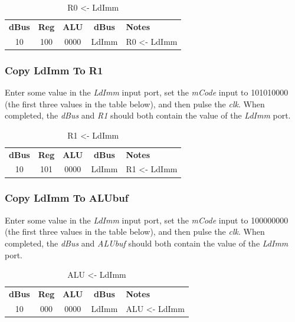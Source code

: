 \begin{table}[H]
	\sffamily
	\newcommand{\head}[1]{\textcolor{white}{\textbf{#1}}}		
	\begin{center}
		\begin{tabular}{ccccl} 
			\textbf{dBus} & \textbf{Reg} & \textbf{ALU} & \textbf{dBus} & \textbf{Notes} \\
			10 & 100 & 0000 & LdImm & R0 <- LdImm \\
		\end{tabular}
	\end{center}
	\caption{R0 <- LdImm}
	\label{tab:11-01}
\end{table}

\subsubsection{Copy LdImm To R1}
Enter some value in the \textit{LdImm} input port, set the \textit{mCode} input to 101010000 (the first three values in the table below), and then pulse the \textit{clk}. When completed, the \textit{dBus} and \textit{R1} should both contain the value of the \textit{LdImm} port.

\begin{table}[H]
	\sffamily
	\newcommand{\head}[1]{\textcolor{white}{\textbf{#1}}}		
	\begin{center}
		\begin{tabular}{ccccl} 
			\textbf{dBus} & \textbf{Reg} & \textbf{ALU} & \textbf{dBus} & \textbf{Notes} \\
			10 & 101 & 0000 & LdImm & R1 <- LdImm
		\end{tabular}
	\end{center}
	\caption{R1 <- LdImm}
	\label{tab:11-02}
\end{table}

\subsubsection{Copy LdImm To ALUbuf}
Enter some value in the \textit{LdImm} input port, set the \textit{mCode} input to 100000000 (the first three values in the table below), and then pulse the \textit{clk}. When completed, the \textit{dBus} and \textit{ALUbuf} should both contain the value of the \textit{LdImm} port.

\begin{table}[H]
	\sffamily
	\newcommand{\head}[1]{\textcolor{white}{\textbf{#1}}}		
	\begin{center}
		\begin{tabular}{ccccl} 
			\textbf{dBus} & \textbf{Reg} & \textbf{ALU} & \textbf{dBus} & \textbf{Notes} \\
			10 & 000 & 0000 & LdImm & ALU <- LdImm
		\end{tabular}
	\end{center}
	\caption{ALU <- LdImm}
	\label{tab:11-03}
\end{table}

